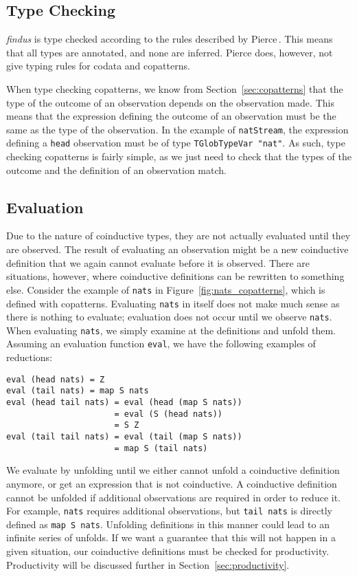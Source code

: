 \subsection{Type Checking}
\textit{findus} is type checked according to the rules described by Pierce\,\cite{Pierce:2002:TPL:509043}. This means that all types are annotated, and none are inferred. Pierce does, however, not give typing rules for codata and copatterns.

When type checking copatterns, we know from Section~\ref{sec:copatterns} that the type of the outcome of an observation depends on the observation made. This means that the expression defining the outcome of an observation must be the same as the type of the observation. In the example of \texttt{natStream}, the expression defining a \texttt{head} observation must be of type \texttt{TGlobTypeVar "nat"}. As such, type checking copatterns is fairly simple, as we just need to check that the types of the outcome and the definition of an observation match.

\subsection{Evaluation}
Due to the nature of coinductive types, they are not actually evaluated until they are observed. The result of evaluating an observation might be a new coinductive definition that we again cannot evaluate before it is observed. There are situations, however, where coinductive definitions can be rewritten to something else. Consider the example of \texttt{nats} in Figure~\ref{fig:nats_copatterns}, which is defined with copatterns. Evaluating \texttt{nats} in itself does not make much sense as there is nothing to evaluate; evaluation does not occur until we observe \texttt{nats}. When evaluating \texttt{nats}, we simply examine at the definitions and unfold them. Assuming an evaluation function \texttt{eval}, we have the following examples of reductions:

\begin{Verbatim}[commandchars=\\\{\},codes={\catcode`$=3\catcode`_=8}]
eval (head nats) = Z
eval (tail nats) = map S nats
eval (head tail nats) = eval (head (map S nats)) 
                      = eval (S (head nats)) 
                      = S Z
eval (tail tail nats) = eval (tail (map S nats)) 
                      = map S (tail nats)
\end{Verbatim}

We evaluate by unfolding until we either cannot unfold a coinductive definition anymore, or get an expression that is not coinductive. A coinductive definition cannot be unfolded if additional observations are required in order to reduce it. For example, \texttt{nats} requires additional observations, but \texttt{tail nats} is directly defined as \texttt{map S nats}. Unfolding definitions in this manner could lead to an infinite series of unfolds. If we want a guarantee that this will not happen in a given situation, our coinductive definitions must be checked for productivity. Productivity will be discussed further in Section~\ref{sec:productivity}. 


